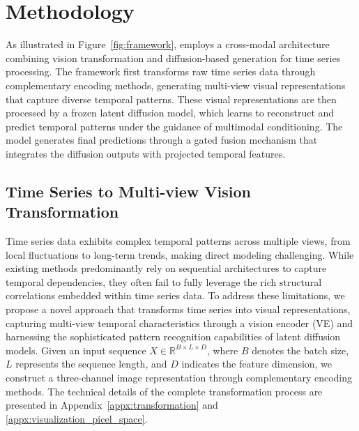 \section{Methodology}
\label{sec:method}
As illustrated in Figure~\ref{fig:framework}, \model employs a cross-modal architecture combining vision transformation and diffusion-based generation for time series processing. The framework first transforms raw time series data through complementary encoding methods, generating multi-view visual representations that capture diverse temporal patterns. These visual representations are then processed by a frozen latent diffusion model, which learns to reconstruct and predict temporal patterns under the guidance of multimodal conditioning. The model generates final predictions through a gated fusion mechanism that integrates the diffusion outputs with projected temporal features.

\subsection{Time Series to Multi-view Vision Transformation}
Time series data exhibits complex temporal patterns across multiple views, from local fluctuations to long-term trends, making direct modeling challenging. While existing methods predominantly rely on sequential architectures to capture temporal dependencies, they often fail to fully leverage the rich structural correlations embedded within time series data. To address these limitations, we propose a novel approach that transforms time series into visual representations, capturing multi-view temporal characteristics through a vision encoder (VE) and harnessing the sophisticated pattern recognition capabilities of latent diffusion models. Given an input sequence $X \in \mathbb{R}^{B \times L \times D}$, where $B$ denotes the batch size, $L$ represents the sequence length, and $D$ indicates the feature dimension, we construct a three-channel image representation through complementary encoding methods. The technical details of the complete transformation process are presented in Appendix~\ref{appx:transformation} and \ref{appx:visualization_picel_space}.

